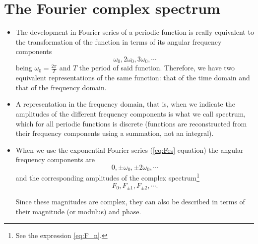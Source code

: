 \section{The Fourier complex spectrum}
\begin{itemize}
\item The development in Fourier series of a periodic function is
  really equivalent to the transformation of the function in terms of
  its angular frequency components
  \begin{equation*}
    \omega_0, 2\omega_0, 3\omega_0, \cdots
  \end{equation*}
  being $\omega_0 = \frac{2\pi}{T}$ and $T$ the period of said
  function. Therefore, we have two equivalent representations of the
  same function: that of the time domain and that of the frequency
  domain.
\item A representation in the frequency domain, that is, when we
  indicate the amplitudes of the different frequency components is
  what we call spectrum, which for all periodic functions is discrete
  (functions are reconstructed from their frequency components using a
  summation, not an integral).
\item When we use the exponential Fourier series (\ref{eq:Fes}
  equation) the angular frequency components are
  \begin{equation*}
    0, \pm \omega_0, \pm 2\omega_0, \cdots
  \end{equation*}
  and the corresponding amplitudes of the complex
  spectrum\footnote{See the expression \ref{eq:F_n}.}
  \begin{equation*}
    F_0, F_{\pm 1}, F_{\pm 2}, \cdots.
  \end{equation*}

  Since these magnitudes are complex, they can also be described in
  terms of their magnitude (or modulus) and phase.
\end{itemize}


